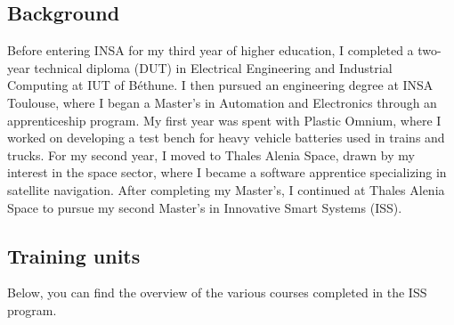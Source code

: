 \vspace{1em} 

\newpage
\subsection{Background}

Before entering INSA for my third year of higher education, I completed a two-year technical diploma (DUT) in Electrical Engineering and Industrial Computing at IUT of Béthune. 
I then pursued an engineering degree at INSA Toulouse, where I began a Master’s in Automation and Electronics through an apprenticeship program. 
My first year was spent with Plastic Omnium, where I worked on developing a test bench for heavy vehicle batteries used in trains and trucks. 
For my second year, I moved to Thales Alenia Space, drawn by my interest in the space sector, where I became a software apprentice specializing in satellite navigation.
After completing my Master’s, I continued at Thales Alenia Space to pursue my second Master’s in Innovative Smart Systems (ISS).



\subsection{Training units}

Below, you can find the overview of the various courses completed in the ISS program.

